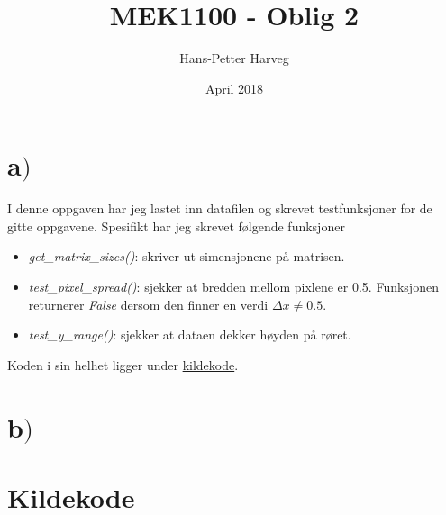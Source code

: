 \documentclass{article}
\title{MEK1100 - Oblig 2}
\author{Hans-Petter Harveg}
\date{April 2018}
\begin{document}
\maketitle

\section*{a$)$}

I denne oppgaven har jeg lastet inn datafilen og skrevet testfunksjoner for de gitte oppgavene. Spesifikt har jeg skrevet følgende funksjoner
\begin{itemize}
\item \textit{get\_matrix\_sizes()}: skriver ut simensjonene på matrisen.
\item \textit{test\_pixel\_spread()}: sjekker at bredden mellom pixlene er 0.5. Funksjonen returnerer \textit{False} dersom den finner en verdi $\Delta x \neq 0.5$.
\item \textit{test\_y\_range()}: sjekker at dataen dekker høyden på røret.
\end{itemize}
Koden i sin helhet ligger under \hyperlink{sourcecode}{kildekode}.

\section*{b$)$}






\section*{Kildekode}
\hypertarget{sourcecode}{}

\end{document}
